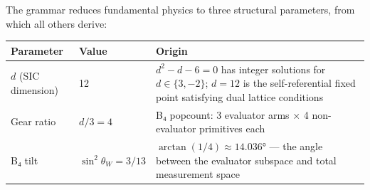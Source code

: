 The grammar reduces fundamental physics to three structural parameters,
from which all others derive:

\begin{longtable}[]{@{}lll@{}}
\toprule
\begin{minipage}[b]{0.39\columnwidth}\raggedright
Parameter\strut
\end{minipage} & \begin{minipage}[b]{0.25\columnwidth}\raggedright
Value\strut
\end{minipage} & \begin{minipage}[b]{0.28\columnwidth}\raggedright
Origin\strut
\end{minipage}\tabularnewline
\midrule
\endhead
\begin{minipage}[t]{0.39\columnwidth}\raggedright
\(d\) (SIC dimension)\strut
\end{minipage} & \begin{minipage}[t]{0.25\columnwidth}\raggedright
12\strut
\end{minipage} & \begin{minipage}[t]{0.28\columnwidth}\raggedright
\(d^2 - d - 6 = 0\) has integer solutions for \(d \in \{3, -2\}\);
\(d=12\) is the self-referential fixed point satisfying dual lattice
conditions\strut
\end{minipage}\tabularnewline
\begin{minipage}[t]{0.39\columnwidth}\raggedright
Gear ratio\strut
\end{minipage} & \begin{minipage}[t]{0.25\columnwidth}\raggedright
\(d/3 = 4\)\strut
\end{minipage} & \begin{minipage}[t]{0.28\columnwidth}\raggedright
B₄ popcount: 3 evaluator arms × 4 non-evaluator primitives each\strut
\end{minipage}\tabularnewline
\begin{minipage}[t]{0.39\columnwidth}\raggedright
B₄ tilt\strut
\end{minipage} & \begin{minipage}[t]{0.25\columnwidth}\raggedright
\(\sin^2\theta_W = 3/13\)\strut
\end{minipage} & \begin{minipage}[t]{0.28\columnwidth}\raggedright
\(\arctan(1/4) \approx 14.036°\) --- the angle between the evaluator
subspace and total measurement space\strut
\end{minipage}\tabularnewline
\bottomrule
\end{longtable}

